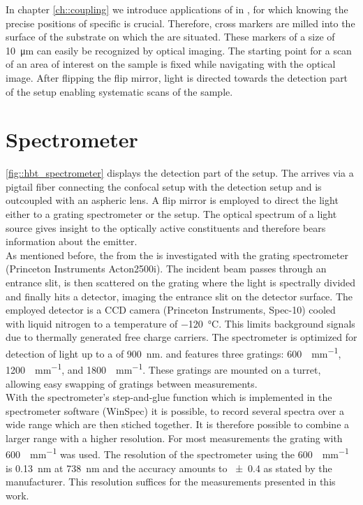 		In chapter \autoref{ch::coupling} we introduce applications of \sivs in \nds, for which knowing the precise positions of specific \nds is crucial.
		Therefore, cross markers are milled into the surface of the substrate on which the \nds are situated.
		These markers of a size of \SI{10}{\micro\meter} can easily be recognized by optical imaging.
		The starting point for a scan of an area of interest on the sample is fixed while navigating with the optical image.
		After flipping the flip mirror, light is directed towards the detection part of the setup enabling systematic scans of the sample.

	\section{Spectrometer} \label{sec::methods_spectrometer}

		\autoref{fig::hbt_spectrometer} displays the detection part of the setup.
		The \fl arrives via a pigtail fiber connecting the confocal setup with the detection setup and is outcoupled with an aspheric lens.
		A flip mirror is employed to direct the light either to a grating spectrometer or the \hbt setup.
		The optical spectrum of a light source gives insight to the optically active constituents and therefore bears information about the emitter.
		\\
		As mentioned before, the \fl from the \sivs is investigated with the grating spectrometer (Princeton Instruments Acton2500i).
		The incident beam passes through an entrance slit, is then scattered on the grating where the light is spectrally divided and finally hits a detector, imaging the entrance slit on the detector surface.
		The employed detector is a CCD camera (Princeton Instruments, Spec-10) cooled with liquid nitrogen to a temperature of \SI{-120}{\celsius}. This limits background signals due to thermally generated free charge carriers.
		The spectrometer is optimized for detection of light up to a \wl of \SI{900}{nm}.
		and features three gratings: \SI[per-mode=symbol]{600}{\lines\per\mm}, \SI[per-mode=symbol]{1200}{\lines\per\mm}, and \SI[per-mode=symbol]{1800}{\lines\per\mm}.
		These gratings are mounted on a turret, allowing easy swapping of gratings between measurements.
		\\
		With the spectrometer's step-and-glue function which is implemented in the spectrometer software (WinSpec) it is possible, to record several spectra over a wide \wl range which are then stiched together.
		It is therefore possible to combine a larger \wl range with a higher resolution.
		For most measurements the grating with \SI[per-mode=symbol]{600}{\lines\per\mm} was used.
		The resolution of the spectrometer using the \SI{600}{\lines\per\mm} is \SI{0.13}{nm} at \SI{738}{nm} and the accuracy amounts to \num{\pm0.4} as stated by the manufacturer.
		This resolution suffices for the measurements presented in this work.

